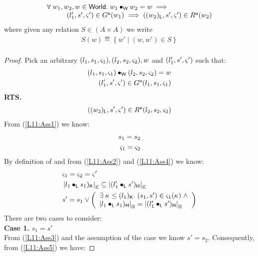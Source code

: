 \begin{lemma}[] \label{lem:updateGContainment}
%
\[
\begin{array}{l}
	\forall\; w_1, w_2, w \in \textsf{World}.\; w_1 \bullet_{\textsf{W}} w_2 = w \implies\\
	\hspace*{1cm}(l'_1, s', \varsigma_{}') \in G^{\textsf{u}}(w_1) \implies ((w_2)_{\textsf{L}}, s', \varsigma_{}') \in R^{\textsf{u}}(w_2)
\end{array}
\]
%
where given any relation $S \in (A \times A)$ we write
%
\[
\begin{array}{l}
	S(w) \eqdef \left\{w' \;|\; (w, w') \in S \right\}\\
\end{array}
\]
%
\begin{proof} Pick an arbitrary $(l_1, s_1, \varsigma_{1}), (l_2, s_2, \varsigma_{2}), w$ and $(l'_1, s', \varsigma_{}')$ such that:
%
\begin{align}
	(l_1, s_1, \varsigma_{1}) \bullet_{\textsf{W}} (l_2, s_2, \varsigma_{2}) = w \label{L11:Ass1}\\
	(l'_1, s', \varsigma_{}') \in G^{\textsf{u}}(l_1, s_1, \varsigma_{1}) \label{L11:Ass2}
\end{align}
%
\textbf{RTS.}
%
\begin{align}
	((w_2)_{\textsf{L}}, s', \varsigma_{}') \in R^{\textsf{u}}(l_2, s_2, \varsigma_{2}) \label{L11:Goal}
\end{align}
From (\ref{L11:Ass1}) we know:
%
\begin{align}
	s_1 = s_2 \label{L11:Ass3}\\
	\varsigma_{1} = \varsigma_{2} \label{L11:Ass4}
\end{align}
%
By definition of \updateG and from (\ref{L11:Ass2}) and (\ref{L11:Ass4}) we know:
%
\begin{align}
	& \varsigma_{1} = \varsigma_{2} = \varsigma_{}' \label{L11:Ass5} \\
	& \left\lvert l_1 \bullet_{\textsf{L}} s_1)_{\textsf{K}}\right\rvert_{\mathbb{K}} \subseteq \left\lvert (l'_1 \bullet_{\textsf{L}} s')_{\textsf{H}}\right\rvert_{\mathbb{K}} \label{L11:Perms} \\
	& s' = s_1 \lor 
	\left(\begin{array}{l}
		\exists\; \kappa_{} \leq (l_1)_{\textsf{K}}.\;  (s_1, s') \in \varsigma_{1}(\kappa_{}) \;\land \\
		\left\lvert l_1 \bullet_{\textsf{L}} s_1)_{\textsf{H}}\right\rvert_{\mathbb{H}} = \left\lvert (l'_1 \bullet_{\textsf{L}} s')_{\textsf{H}}\right\rvert_{\mathbb{H}}
	\end{array} \right) \nonumber
\end{align}
%
There are two cases to consider:\\

\noindent\textbf{Case 1.} $s_1 = s'$\\
From (\ref{L11:Ass3}) and the assumption of the case we know $s' = s_2$. Consequently, from (\ref{L11:Ass5}) we have:


\end{proof}
\end{lemma}
